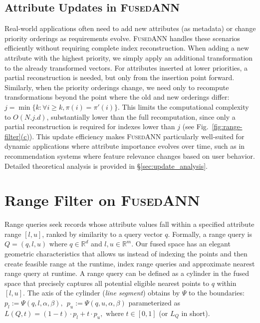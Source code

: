 \documentclass[numbers,sort]{article}
\begin{document}
\subsection{Attribute Updates in \textsc{FusedANN}}
Real-world applications often need to add new attributes (as metadata) or change priority orderings as requirements evolve. \textsc{FusedANN} handles these scenarios efficiently without requiring complete index reconstruction. When adding a new attribute with the highest priority, we simply apply an additional transformation to the already transformed vectors. For attributes inserted at lower priorities, a partial reconstruction is needed, but only from the insertion point forward. Similarly, when the priority orderings change, we need only to recompute transformations beyond the point where the old and new orderings differ: $j = \min\{k:\forall i\ge k, \pi(i)=\pi'(i)\}$. This limits the computational complexity to $O(N.j.d)$, substantially lower than the full recomputation, since only a partial reconstruction is required for indexes lower than $j$ (see Fig.~\hyperref[fig:range-filter]{\ref*{fig:range-filter}(c)}). This update efficiency makes \textsc{FusedANN} particularly well-suited for dynamic applications where attribute importance evolves over time, such as in recommendation systems where feature relevance changes based on user behavior. Detailed theoretical analysis is provided in \hyperref[sec:update_analysis]{\S\ref*{sec:update_analysis}}.


\section{Range Filter on \textsc{FusedANN}}
\label{sec:range-fcvi}
Range queries seek records whose attribute values fall within a specified attribute range $[l, u]$, ranked by similarity to a query vector $q$. Formally, a range query is $Q = (q, l, u)$ where $q \in \mathbb{R}^d$ and $l, u \in \mathbb{R}^m$. Our fused space has an elegant geometric characteristics that allows us instead of indexing the points and then create feasible range at the runtime, index range queries and approximate nearest range query at runtime. A range query can be defined as a cylinder in the fused space that precisely captures all potential eligible nearest points to $q$ within $[l, u]$. The axis of the cylinder (\textit{line segment}) obtains by $\Psi$ to the boundaries: \(p_l := \Psi(q, l, \alpha, \beta),~~p_u := \Psi(q, u, \alpha, \beta)\) parameterized as $L(Q, t) = (1-t) \cdot p_l + t \cdot p_u, \text{ where } t \in [0,1]$ (or $L_Q$ in short). 
\end{document}
